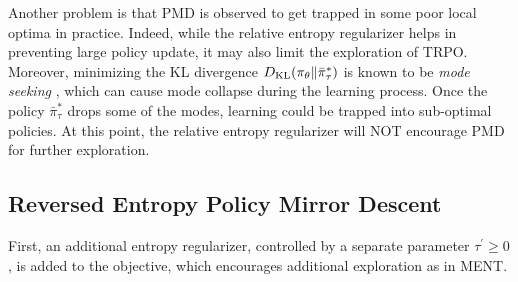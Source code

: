 Another problem is that PMD is observed to get trapped in some poor local optima in practice. 
Indeed, while the relative entropy regularizer helps in preventing large policy update, it may also limit the exploration of TRPO.
Moreover, minimizing the KL divergence $D_{\mathrm{KL}}(\pi_\theta \| \bar{\pi}_\tau^*) $ is known to be \emph{mode seeking} \citep{kevin2012machine}, which can cause mode collapse during the learning process. Once the policy $\bar{\pi}_\tau^*$ drops some of the modes, learning could be trapped into sub-optimal policies.
At this point, the relative entropy regularizer will NOT encourage PMD for further exploration.



\subsection{Reversed Entropy Policy Mirror Descent }
\label{subsec:repmd}
First, an additional entropy regularizer, controlled by a separate parameter $\tau^{\prime}\geq 0$, is added to the objective, which encourages additional exploration as in MENT.

